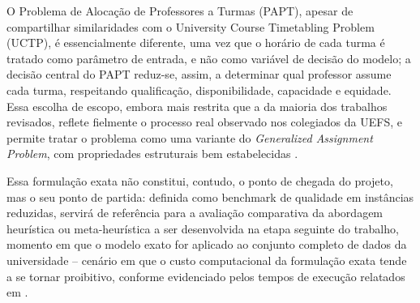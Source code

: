\documentclass[11pt,a4paper]{article}
\begin{document}
O Problema de Alocação de Professores a Turmas (PAPT), apesar de compartilhar similaridades com o University Course Timetabling Problem (UCTP), é essencialmente diferente, uma vez que o horário de cada turma é tratado como parâmetro de entrada, e não como variável de decisão do modelo; a decisão central do PAPT reduz-se, assim, a determinar qual
professor assume cada turma, respeitando qualificação, disponibilidade, capacidade e equidade. Essa escolha de escopo, embora mais restrita que a da maioria dos trabalhos revisados, reflete fielmente o processo real observado nos colegiados da UEFS, e permite tratar o problema como uma variante do \textit{Generalized
Assignment Problem}, com propriedades estruturais bem estabelecidas
\cite{arenales2007pesquisa,martellototh1990}.


Essa formulação exata não constitui, contudo, o ponto de chegada do projeto, mas o seu
ponto de partida: definida como benchmark de qualidade em instâncias reduzidas, servirá
de referência para a avaliação comparativa da abordagem heurística ou meta-heurística a
ser desenvolvida na etapa seguinte do trabalho, momento em que o modelo exato for
aplicado ao conjunto completo de dados da universidade -- cenário em que o custo
computacional da formulação exata tende a se tornar proibitivo, conforme evidenciado
pelos tempos de execução relatados em \cite{nogueira2018,permanhane2014}.



\end{document}
